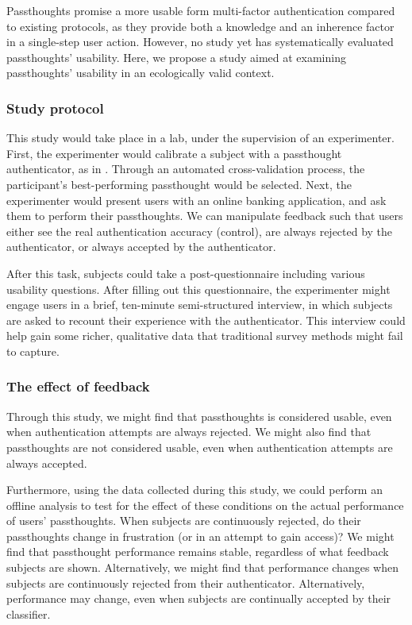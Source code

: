 \documentclass[sigconf]{acmart}
\begin{document}
Passthoughts promise a more usable form multi-factor authentication compared to existing protocols,
as they provide both a knowledge and an inherence factor in a single-step user action.
However, no study yet has systematically evaluated passthoughts' usability.
Here, we propose a study aimed at examining passthoughts' usability in an ecologically valid context.

\subsubsection{Study protocol}
\label{sec:orgf3dd9d1}

This study would take place in a lab, under the supervision of an experimenter.
First, the experimenter would calibrate a subject with a passthought authenticator, as in \cite{Chuang2013b}.
Through an automated cross-validation process, the participant's best-performing passthought would be selected.
Next, the experimenter would present users with an online banking application, and ask them to perform their passthoughts.
We can manipulate feedback such that users either see the real authentication accuracy (control), 
are always rejected by the authenticator, 
or always accepted by the authenticator.

After this task, subjects could take a post-questionnaire including various usability questions.
After filling out this questionnaire, the experimenter might engage users in a brief, ten-minute semi-structured interview,
in which subjects are asked to recount their experience with the authenticator.
This interview could help gain some richer, qualitative data that traditional survey methods might fail to capture.

\subsubsection{The effect of feedback}
\label{sec:orged55079}

Through this study, we might find 
that passthoughts is considered usable, even when authentication attempts are always rejected.
We might also find that passthoughts are not considered usable, 
even when authentication attempts are always accepted.

Furthermore, using the data collected during this study, we could perform an offline analysis 
to test for the effect of these conditions on the actual performance of users' passthoughts.
When subjects are continuously rejected, do their passthoughts change in frustration (or in an attempt to gain access)?
We might find that passthought performance 
remains stable, regardless of what feedback subjects are shown.
Alternatively, we might find that performance changes 
when subjects are continuously rejected from their authenticator.
Alternatively, performance may change, 
even when subjects are continually accepted by their classifier.
\end{document}

